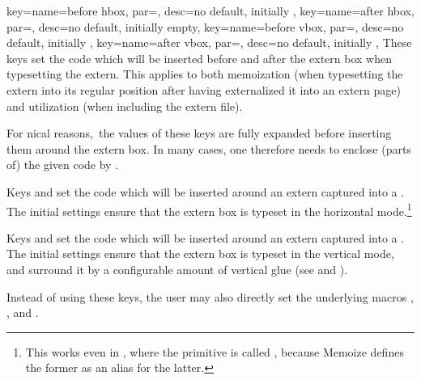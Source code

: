 \documentclass[a4paper,11pt]{article}
\begin{document}
\begin{doc}{
    key={name=before hbox, par={},
      desc={no default, initially }},
    key={name=after hbox, par={},
      desc={no default, initially empty}},
    key={name=before vbox, par={}, desc={no default,
        initially }},
    key={name=after vbox, par={}, desc={no default,
        initially }},
  }
  These keys set the code which will be inserted before and after the extern
  box when typesetting the extern.  This applies to both memoization (when
  typesetting the extern into its regular position after having externalized it
  into an extern page) and utilization (when including the extern file).

  \begin{tcolorbox}[warning]
    For nical reasons,\footnotemark\ the values of these keys are
    fully expanded before inserting them around the extern box.  In many cases,
    one therefore needs to enclose (parts of) the given code by
    .
  \end{tcolorbox}
  
  Keys  and  set the code which will be
  inserted around an extern captured into a .  The initial
  settings ensure that the extern box is typeset in the horizontal
  mode.\footnote{This works even in , where the
     primitive is called , because Memoize
    defines the former as an alias for the latter.}

  Keys  and  set the code which will be
  inserted around an extern captured into a .  The initial
  settings ensure that the extern box is typeset in the vertical mode, and
  surround it by a configurable amount of vertical glue (see 
  and ).

  Instead of using these keys, the user may also directly set the underlying
  macros , ,
   and .
\end{doc}
\end{document}
